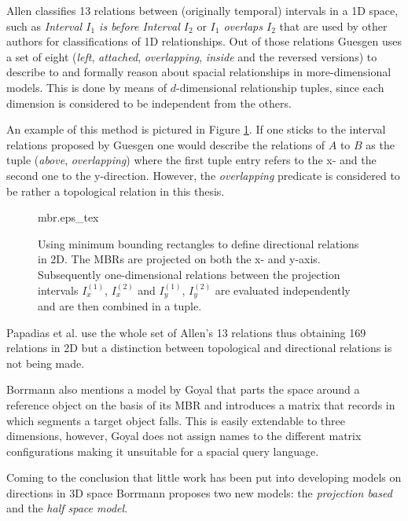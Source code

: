 \documentclass[paper=a4, fontsize=11pt]{scrartcl} %
\numberwithin{equation}{section} %
\numberwithin{figure}{section} %
\numberwithin{table}{section} %
\begin{document}
Allen \cite{Allen:1983:MKT:182.358434} classifies 13 relations between (originally temporal) intervals in a 1D space, such as \textit{Interval $I_1$ is before Interval $I_2$} or \textit{$I_1$ overlaps $I_2$} that are used by other authors for classifications of 1D relationships. Out of those relations Guesgen \cite{guesgen1989spatial} uses a set of eight (\emph{left}, \emph{attached}, \emph{overlapping}, \emph{inside} and the reversed versions) to describe to and formally reason about spacial relationships in more-dimensional models. This is done by means of $d$-dimensional relationship tuples, since each dimension is considered to be independent from the others. 

An example of this method is pictured in Figure \ref{fig:mbr}. If one sticks to the interval relations proposed by Guesgen one would describe the relations of $A$ to $B$ as the tuple (\emph{above}, \emph{overlapping}) where the first tuple entry refers to the x- and the second one to the y-direction. However, the \emph{overlapping} predicate is considered to be rather a topological relation in this thesis. 

\begin{figure}
  \centering
  \def\svgwidth{20em}
  {mbr.eps_tex}
  \caption{Using minimum bounding rectangles to define directional relations in 2D. The MBRs are projected on both the x- and y-axis. Subsequently one-dimensional relations between the projection intervals $I^{(1)}_x$, $I^{(2)}_x$  and $I^{(1)}_y$, $I^{(2)}_y$ are evaluated independently and are then combined in a tuple.}
\label{fig:mbr}
\end{figure}

Papadias et al. \cite{papadias1995topological} use the whole set of Allen's 13 relations thus obtaining 169 relations in 2D but a distinction between topological and directional relations is not being made. 

Borrmann also mentions a model by Goyal \cite{goyal2000similarity} that parts the space around a reference object on the basis of its MBR and introduces a matrix that records in which segments a target object falls. This is easily extendable to three dimensions, however, Goyal does not assign names to the different matrix configurations making it unsuitable for a spacial query language.  

Coming to the conclusion that little work has been put into developing models on directions in 3D space Borrmann \cite{Borrmann:2009:AEI} proposes two new models:  the \textit{projection based} and the \textit{half space model}. 
\end{document}

